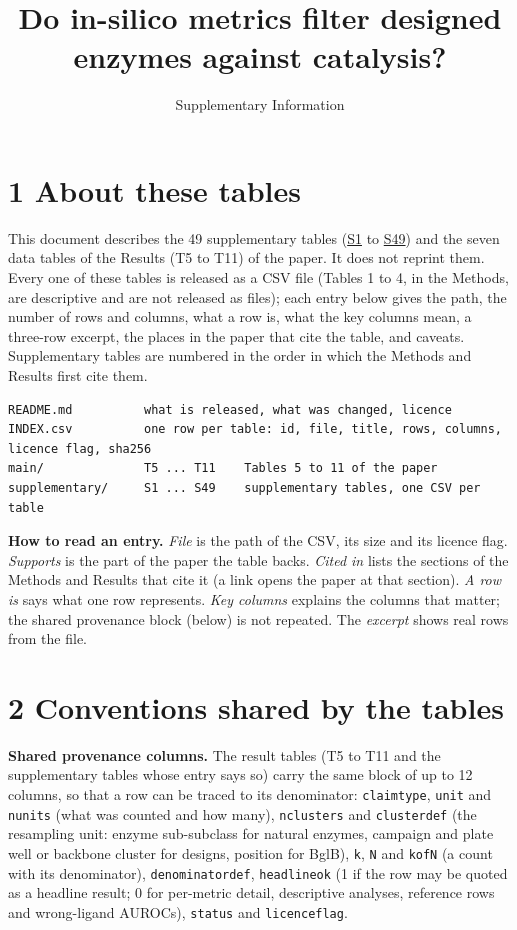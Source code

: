 \documentclass[
  10pt,
]{article}
\title{Do in-silico
metrics filter
designed enzymes
against catalysis?}
\subtitle{Supplementary
Information}
\author{}
\date{}
\DeclareRobustCommand{\_}{\textunderscore\hspace{0pt}}
\begin{document}
\maketitle

\section{1 About
these tables}

This document
describes the 49
supplementary tables
(\protect\hyperlink{S1}{S1}
to
\protect\hyperlink{S49}{S49})
and the seven data
tables of the
Results (T5 to T11)
of the paper. It
does not reprint
them. Every one of
these tables is
released as a CSV
file (Tables 1 to 4,
in the Methods, are
descriptive and are
not released as
files); each entry
below gives the
path, the number of
rows and columns,
what a row is, what
the key columns
mean, a three-row
excerpt, the places
in the paper that
cite the table, and
caveats.
Supplementary tables
are numbered in the
order in which the
Methods and Results
first cite them.

\begin{verbatim}
README.md          what is released, what was changed, licence
INDEX.csv          one row per table: id, file, title, rows, columns, licence flag, sha256
main/              T5 ... T11    Tables 5 to 11 of the paper
supplementary/     S1 ... S49    supplementary tables, one CSV per table
\end{verbatim}

\textbf{How to read
an entry.}
\emph{File} is the
path of the CSV, its
size and its licence
flag.
\emph{Supports} is
the part of the
paper the table
backs. \emph{Cited
in} lists the
sections of the
Methods and Results
that cite it (a link
opens the paper at
that section).
\emph{A row is} says
what one row
represents.
\emph{Key columns}
explains the columns
that matter; the
shared provenance
block (below) is not
repeated. The
\emph{excerpt} shows
real rows from the
file.

\section{2
Conventions shared
by the tables}

\textbf{Shared
provenance columns.}
The result tables
(T5 to T11 and the
supplementary tables
whose entry says so)
carry the same block
of up to 12 columns,
so that a row can be
traced to its
denominator:
\texttt{claim\_type},
\texttt{unit} and
\texttt{n\_units}
(what was counted
and how many),
\texttt{n\_clusters}
and
\texttt{cluster\_def}
(the resampling
unit: enzyme
sub-subclass for
natural enzymes,
campaign and plate
well or backbone
cluster for designs,
position for BglB),
\texttt{k},
\texttt{N} and
\texttt{k\_of\_N} (a
count with its
denominator),
\texttt{denominator\_def},
\texttt{headline\_ok}
(1 if the row may be
quoted as a headline
result; 0 for
per-metric detail,
descriptive
analyses, reference
rows and
wrong-ligand
AUROCs),
\texttt{status} and
\texttt{licence\_flag}.
\end{document}
